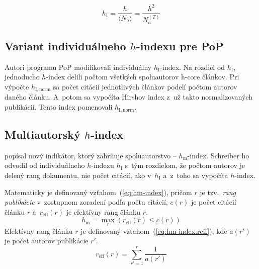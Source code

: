 \begin{equation}
\label{eq:hi-index}
h_{\mathrm{I}} = \frac{h}{\langle N_a \rangle} = \frac{h^2}{N_a^{(T)}}
\end{equation}


\subsection{Variant individuálneho $h$-indexu pre PoP}
\label{sec:hinorm}

Autori programu PoP modifikovali individuálny
$h_{\mathrm{I}}$-index.  Na rozdiel od $h_{\mathrm{I}}$, jednoducho $h$-index
delili počtom všetkých spoluautorov h-core článkov.  Pri výpočte
$h_{\mathrm{I, norm}}$ sa počet citácií jednotlivých článkov podelí počtom
autorov daného článku.  A~potom sa vypočíta Hirshov index z~už takto
normalizovaných publikácií.  Tento index pomenovali $h_{\mathrm{I, norm}}$.


\subsection{Multiautorský $h$-index}
\label{sec:hm-index}

\citet{Schreiber2008} popísal nový indikátor, ktorý zahrňuje spoluautorstvo --
$h_{\mathrm{m}}$-index.  Schreiber ho odvodil od individuálneho $h$-indexu
$h_{\mathrm{I}}$ s~tým rozdielom, že počtom autorov je delený rang dokumentu,
nie počet citácií, ako v~$h_{\mathrm{I}}$ a~z~toho sa vypočíta $h$-index.

Matematicky je definovaný vzťahom~(\ref{eq:hm-index}), pričom $r$ je
tzv.~\emph{rang publikácie} v~zostupnom zoradení podľa počtu citácií, $c(r)$ je
počet citácií článku $r$ a~$r_{\mathrm{eff}}(r)$ je efektívny rang článku $r$.
\begin{equation}
\label{eq:hm-index}
h_{\mathrm{m}} = \max_r{(r_{\mathrm{eff}}(r) \leq c(r))}
\end{equation}
Efektívny rang článku $r$ je definovaný vzťahom~(\ref{eq:hm-index.reff}), kde
$a(r')$ je počet autorov publikácie $r'$.
\begin{equation}
\label{eq:hm-index.reff}
r_{\mathrm{eff}}(r) = \sum_{r'=1}^r{\frac{1}{a(r')}}
\end{equation}


